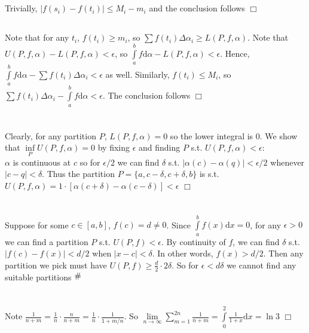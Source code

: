 \documentclass{article}
\newcommand{\contra}{\raisebox{\depth}{\#}}
\begin{document}
\subsection{}
Trivially, $|f(s_i) - f(t_i)| \leq M_i - m_i$ and the conclusion follows $\Box$

\subsection{}
Note that for any $t_i$, $f(t_i) \geq m_i$, so $\sum f(t_i)\Delta \alpha_i \geq L(P,f,\alpha)$. Note that $U(P,f,\alpha) - L(P,f,\alpha) < \epsilon$, so $\int\limits_a^b f\mathrm{d} \alpha - L(P,f,\alpha) < \epsilon$. Hence, $\int\limits_a^b f\mathrm{d} \alpha - \sum f(t_i)\Delta \alpha_i < \epsilon$ as well. Similarly, $f(t_i) \leq M_i$, so $\sum f(t_i)\Delta \alpha_i - \int\limits_a^b f\mathrm{d} \alpha < \epsilon$. The conclusion follows $\Box$

\section{}
Clearly, for any partition $P$, $L(P,f,\alpha) = 0$ so the lower integral is 0. We show that $\inf\limits_P U(P,f,\alpha) = 0$ by fixing $\epsilon$ and finding $P$ s.t. $U(P,f,\alpha) < \epsilon$:\\
$\alpha$ is continuous at $c$ so for $\epsilon/2$ we can find $\delta$ s.t. $|\alpha(c) - \alpha(q)| < \epsilon /2$ whenever $|c-q| < \delta$. Thus the partition $P = \{a,c - \delta, c + \delta,b\}$ is s.t. $U(P,f,\alpha) = 1\cdot [\alpha(c+\delta) - \alpha(c-\delta)] < \epsilon$ $\Box$

\section{}
Suppose for some $c\in [a,b]$, $f(c) = d \neq 0$. Since $\int\limits_a^b f(x) \mathrm{d}x = 0$, for any $\epsilon > 0$ we can find a partition $P$ s.t. $U(P,f) < \epsilon$. By continuity of $f$, we can find $\delta$ s.t. $|f(c) - f(x)| < d/2$ when $|x-c| < \delta$. In other words, $f(x) > d/2$. Then any partition we pick must have $U(P,f) \geq \frac{d}{2}\cdot 2\delta$. So for $\epsilon < d\delta$ we cannot find any suitable partitions $\contra$

\section{}
\subsection{}
Note $\frac{1}{n+m} = \frac{1}{n}\cdot \frac{n}{n+m} = \frac{1}{n} \cdot \frac{1}{1+m/n}$. So $\lim\limits_{n\rightarrow\infty} \sum\limits_{m=1}^{2n} \frac{1}{n+m} = \int\limits_0^2 \frac{1}{1+x} \mathrm{d}x = \ln 3$ $\Box$
\end{document}
